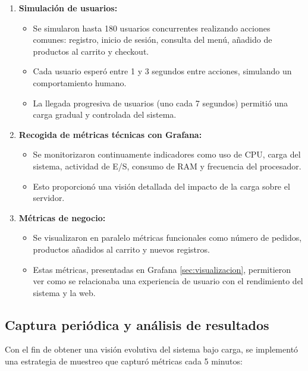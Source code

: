 \documentclass[10pt]{book}
\begin{document}
\begin{enumerate}
    \item \textbf{Simulación de usuarios:}
    \begin{itemize}
        \item Se simularon hasta 180 usuarios concurrentes realizando acciones comunes: registro, inicio de sesión, consulta del menú, añadido de productos al carrito y checkout.
        \item Cada usuario esperó entre 1 y 3 segundos entre acciones, simulando un comportamiento humano.
        \item La llegada progresiva de usuarios (uno cada 7 segundos) permitió una carga gradual y controlada del sistema.
    \end{itemize}

    \item \textbf{Recogida de métricas técnicas con Grafana:}
    \begin{itemize}
        \item Se monitorizaron continuamente indicadores como uso de CPU, carga del sistema, actividad de E/S, consumo de RAM y frecuencia del procesador.
        \item Esto proporcionó una visión detallada del impacto de la carga sobre el servidor.
    \end{itemize}

    \item \textbf{Métricas de negocio:}
    \begin{itemize}
        \item Se visualizaron en paralelo métricas funcionales como número de pedidos, productos añadidos al carrito y nuevos registros.
        \item Estas métricas, presentadas en Grafana \autoref{sec:visualizacion}, permitieron ver como se relacionaba una experiencia de usuario con el rendimiento del sistema y la web.
    \end{itemize}
\end{enumerate}

\subsection{Captura periódica y análisis de resultados} \label{sec: locust_err}
Con el fin de obtener una visión evolutiva del sistema bajo carga, se implementó una estrategia de muestreo que capturó métricas cada 5 minutos:
\end{document}
